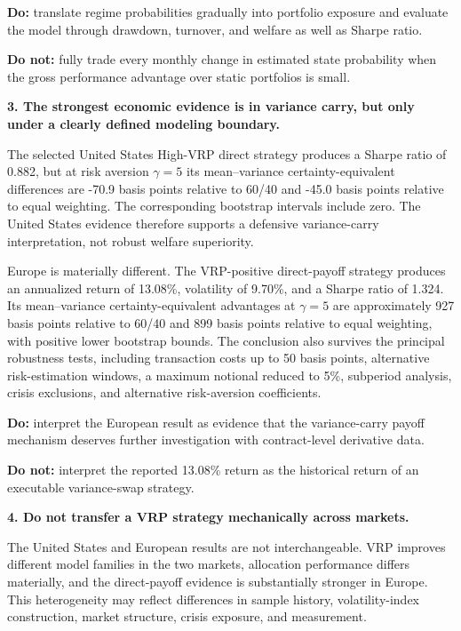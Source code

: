 \textbf{Do:} translate regime probabilities gradually into portfolio exposure and evaluate the
model through drawdown, turnover, and welfare as well as Sharpe ratio.

\textbf{Do not:} fully trade every monthly change in estimated state probability when the gross
performance advantage over static portfolios is small.

\medskip

\textbf{3. The strongest economic evidence is in variance carry, but only under a clearly defined
modeling boundary.}

The selected United States High-VRP direct strategy produces a Sharpe ratio of 0.882, but at
risk aversion $\gamma=5$ its mean--variance certainty-equivalent differences are -70.9 basis
points relative to 60/40 and -45.0 basis points relative to equal weighting. The corresponding
bootstrap intervals include zero. The United States evidence therefore supports a defensive
variance-carry interpretation, not robust welfare superiority.

Europe is materially different. The VRP-positive direct-payoff strategy produces an annualized
return of 13.08\%, volatility of 9.70\%, and a Sharpe ratio of 1.324. Its mean--variance
certainty-equivalent advantages at $\gamma=5$ are approximately 927 basis points relative to
60/40 and 899 basis points relative to equal weighting, with positive lower bootstrap bounds.
The conclusion also survives the principal robustness tests, including transaction costs up to
50 basis points, alternative risk-estimation windows, a maximum notional reduced to 5\%,
subperiod analysis, crisis exclusions, and alternative risk-aversion coefficients.

\textbf{Do:} interpret the European result as evidence that the variance-carry payoff mechanism
deserves further investigation with contract-level derivative data.

\textbf{Do not:} interpret the reported 13.08\% return as the historical return of an executable
variance-swap strategy.

\medskip

\textbf{4. Do not transfer a VRP strategy mechanically across markets.}

The United States and European results are not interchangeable. VRP improves different model
families in the two markets, allocation performance differs materially, and the direct-payoff
evidence is substantially stronger in Europe. This heterogeneity may reflect differences in sample
history, volatility-index construction, market structure, crisis exposure, and measurement.

